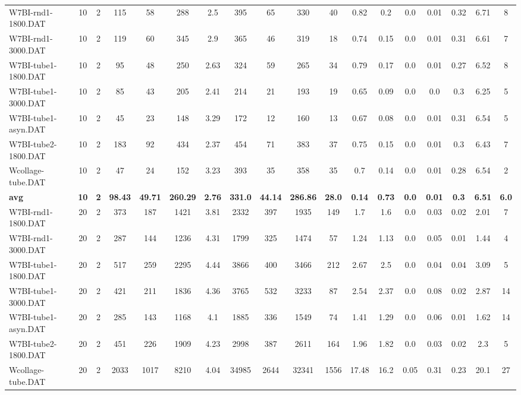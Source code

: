 \begin{sidewaystable}[h]
{\begin{tabular}{lccccccccccccccccc}
W7BI-rnd1-1800.DAT & 10 & 2 & 115 & 58 & 288 & 2.5 & 395 & 65 & 330 & 40 & 0.82 & 0.2 & 0.0 & 0.01 & 0.32 & 6.71 & 8\\
W7BI-rnd1-3000.DAT & 10 & 2 & 119 & 60 & 345 & 2.9 & 365 & 46 & 319 & 18 & 0.74 & 0.15 & 0.0 & 0.01 & 0.31 & 6.61 & 7\\
W7BI-tube1-1800.DAT & 10 & 2 & 95 & 48 & 250 & 2.63 & 324 & 59 & 265 & 34 & 0.79 & 0.17 & 0.0 & 0.01 & 0.27 & 6.52 & 8\\
W7BI-tube1-3000.DAT & 10 & 2 & 85 & 43 & 205 & 2.41 & 214 & 21 & 193 & 19 & 0.65 & 0.09 & 0.0 & 0.0 & 0.3 & 6.25 & 5\\
W7BI-tube1-asyn.DAT & 10 & 2 & 45 & 23 & 148 & 3.29 & 172 & 12 & 160 & 13 & 0.67 & 0.08 & 0.0 & 0.01 & 0.31 & 6.54 & 5\\
W7BI-tube2-1800.DAT & 10 & 2 & 183 & 92 & 434 & 2.37 & 454 & 71 & 383 & 37 & 0.75 & 0.15 & 0.0 & 0.01 & 0.3 & 6.43 & 7\\
Wcollage-tube.DAT & 10 & 2 & 47 & 24 & 152 & 3.23 & 393 & 35 & 358 & 35 & 0.7 & 0.14 & 0.0 & 0.01 & 0.28 & 6.54 & 2\\
\cline{1-18} \textbf{avg} & \textbf{10} & \textbf{2} & \textbf{98.43} & \textbf{49.71} & \textbf{260.29} & \textbf{2.76} & \textbf{331.0} & \textbf{44.14} & \textbf{286.86} & \textbf{28.0} & \textbf{0.14} & \textbf{0.73} & \textbf{0.0} & \textbf{0.01} & \textbf{0.3} & \textbf{6.51} & \textbf{6.0} \\ \cline{1-18}
W7BI-rnd1-1800.DAT & 20 & 2 & 373 & 187 & 1421 & 3.81 & 2332 & 397 & 1935 & 149 & 1.7 & 1.6 & 0.0 & 0.03 & 0.02 & 2.01 & 7\\
W7BI-rnd1-3000.DAT & 20 & 2 & 287 & 144 & 1236 & 4.31 & 1799 & 325 & 1474 & 57 & 1.24 & 1.13 & 0.0 & 0.05 & 0.01 & 1.44 & 4\\
W7BI-tube1-1800.DAT & 20 & 2 & 517 & 259 & 2295 & 4.44 & 3866 & 400 & 3466 & 212 & 2.67 & 2.5 & 0.0 & 0.04 & 0.04 & 3.09 & 5\\
W7BI-tube1-3000.DAT & 20 & 2 & 421 & 211 & 1836 & 4.36 & 3765 & 532 & 3233 & 87 & 2.54 & 2.37 & 0.0 & 0.08 & 0.02 & 2.87 & 14\\
W7BI-tube1-asyn.DAT & 20 & 2 & 285 & 143 & 1168 & 4.1 & 1885 & 336 & 1549 & 74 & 1.41 & 1.29 & 0.0 & 0.06 & 0.01 & 1.62 & 14\\
W7BI-tube2-1800.DAT & 20 & 2 & 451 & 226 & 1909 & 4.23 & 2998 & 387 & 2611 & 164 & 1.96 & 1.82 & 0.0 & 0.03 & 0.02 & 2.3 & 5\\
Wcollage-tube.DAT & 20 & 2 & 2033 & 1017 & 8210 & 4.04 & 34985 & 2644 & 32341 & 1556 & 17.48 & 16.2 & 0.05 & 0.31 & 0.23 & 20.1 & 27\\

\end{tabular}}
\end{sidewaystable}
